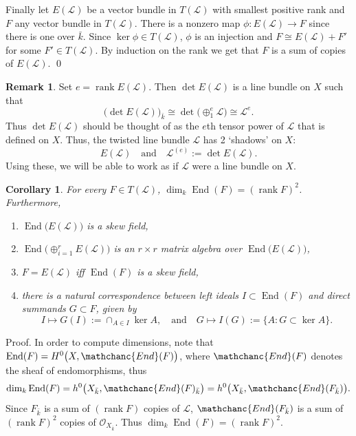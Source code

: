 \documentclass{amsart}
\newtheorem{cor}[thm]{Corollary}
\theoremstyle{definition}
\newtheorem{rem}[thm]{Remark}
\theoremstyle{remark}
\renewcommand{\o}[0]{{\mathcal O}}
\newcommand{\qtq}[1]{\quad\mbox{#1}\quad}
\newcommand{\rank}[0]{\operatorname{rank}}
\newcommand{\End}[0]{\operatorname{End}}
\newcommand{\sEnd}[0]{{\mathchanc{End}}}
\begin{document}
Finally let $E({\mathcal L})$ be a vector bundle in $T({\mathcal L})$ with smallest positive rank
and  $F$  any  vector bundle in $T({\mathcal L})$. There is a 
nonzero map $\phi: E({\mathcal L})\to F$ since there is one over $\bar k$. 
Since $\ker \phi\in T({\mathcal L})$, $\phi$ is an injection and
$F\cong E({\mathcal L})+F'$ for some $F'\in T({\mathcal L})$. By induction on the rank we get that 
 $F$ is a sum of copies of 
$E( {\mathcal L})$. \qed


\begin{rem}\label{2.shadows.rem}
 Set $e=\rank E( {\mathcal L})$. Then
$\det E( {\mathcal L})$ is a line bundle on $X$ such that
$$
\bigl(\det E( {\mathcal L})\bigr)_{\bar k}\cong
\det\bigl(\oplus_{1}^e {\mathcal L}\bigr)\cong {\mathcal L}^e.
$$
Thus $\det E( {\mathcal L})$ should be thought of as the
$e$th tensor power of $ {\mathcal L}$ that is defined on $X$.
Thus,   the twisted line bundle   $ {\mathcal L}$
has 2 `shadows' on $X$:
$$
E( {\mathcal L}) \qtq{and} {\mathcal L}^{(e)}:=\det E( {\mathcal L}).
$$
Using these, we will be able to work as if ${\mathcal L} $
were a line bundle on $X$. 
\end{rem} 


\begin{cor}  \label{split.lem.cor.1} For every $F\in T({\mathcal L})$,
$\dim_k\End(F)=(\rank F)^2$. Furthermore,
\begin{enumerate}
\item 
$\End\bigl(E( {\mathcal L})\bigr)$ is a skew field,
\item $\End\bigl(\oplus_{i=1}^r E( {\mathcal L})\bigr)$ is an $r\times r$ matrix
algebra over $\End\bigl(E( {\mathcal L})\bigr)$,
\item $F=E( {\mathcal L})$ iff $\End(F)$ is a skew field, 
\item there is a natural correspondence between left ideals  $I\subset \End(F)$ and
direct summands   $G\subset F$, given by
$$
I\mapsto G(I):=\cap_{A\in I}\ker A,\qtq{and}
G\mapsto I(G):=\{A: G\subset \ker A\}.
$$
\end{enumerate}
\end{cor}

Proof. In order to compute  dimensions, note that   
$\End(F)=H^0\bigl(X, \sEnd(F)\bigr)$, where $\sEnd(F) $ denotes the sheaf of endomorphisms, thus
$$
\dim_k \End(F)=h^0\bigl(X_{\bar k}, \sEnd(F)_{\bar k}\bigr)=
h^0\bigl(X_{\bar k}, \sEnd(F_{\bar k})\bigr).
$$
Since $F_{\bar k}$ is a sum of $(\rank F)$ copies of ${\mathcal L}$,
$ \sEnd(F_{\bar k})$ is a sum of $(\rank F)^2$ copies of $\o_{X_{\bar k}}$.
Thus $ \dim_k \End(F)=(\rank F)^2$.
\end{document}
